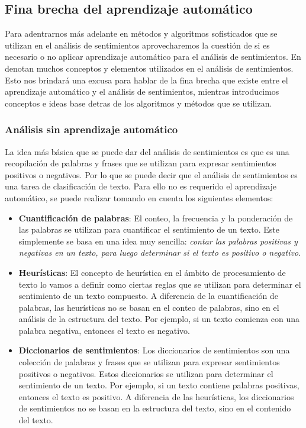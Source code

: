 \documentclass[conference]{IEEEtran}
\begin{document}
\subsection{Fina brecha del aprendizaje automático}
Para adentrarnos más adelante en métodos y algoritmos sofisticados que se utilizan en el análisis de sentimientos aprovecharemos la cuestión de si es necesario o no aplicar aprendizaje automático para el análisis de sentimientos. 
En \cite{b5} denotan muchos conceptos y elementos utilizados en el análisis de sentimientos. Esto nos brindará una excusa para hablar de la fina brecha que existe entre el aprendizaje automático y el análisis de sentimientos, mientras introducimos conceptos e ideas base detras de los algoritmos y métodos que se utilizan.

\subsubsection{Análisis sin aprendizaje automático}
La idea más básica que se puede dar del análisis de sentimientos es que es una recopilación de palabras y frases que se utilizan para expresar sentimientos positivos o negativos. Por lo que se puede decir que el análisis de sentimientos es una tarea de clasificación de texto. Para ello no es requerido el aprendizaje automático, se puede realizar tomando en cuenta los siguientes elementos:
\begin{itemize}
\item \textbf{Cuantificación de palabras}: El conteo, la frecuencia y la ponderación de las palabras se utilizan para cuantificar el sentimiento de un texto. Este simplemente se basa en una idea muy sencilla: \textit{contar las palabras positivas y negativas en un texto, para luego determinar si el texto es positivo o negativo}.
\item \textbf{Heurísticas}: El concepto de heurística en el ámbito de procesamiento de texto lo vamos a definir como ciertas reglas que se utilizan para determinar el sentimiento de un texto compuesto. 
A diferencia de la cuantificación de palabras, las heurísticas no se basan en el conteo de palabras, sino en el análisis de la estructura del texto. 
Por ejemplo, si un texto comienza con una palabra negativa, entonces el texto es negativo.
\item \textbf{Diccionarios de sentimientos}: Los diccionarios de sentimientos son una colección de palabras y frases que se utilizan para expresar sentimientos positivos o negativos. 
Estos diccionarios se utilizan para determinar el sentimiento de un texto. 
Por ejemplo, si un texto contiene palabras positivas, entonces el texto es positivo. 
A diferencia de las heurísticas, los diccionarios de sentimientos no se basan en la estructura del texto, sino en el contenido del texto.
\end{itemize}
\end{document}
